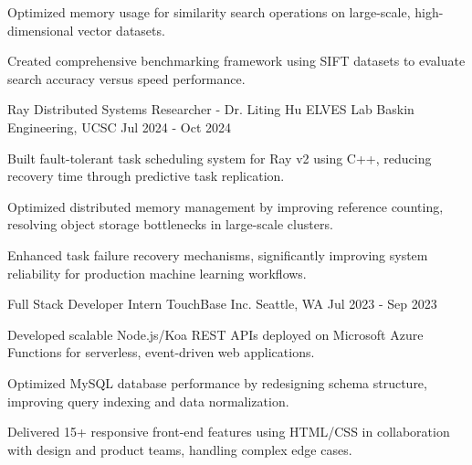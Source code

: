 \begin{cventries}
{\begin{cvitems}
        \item {Optimized memory usage for similarity search operations on large-scale, high-dimensional vector datasets.}
        \item {Created comprehensive benchmarking framework using SIFT datasets to evaluate search accuracy versus speed performance.}
        \end{cvitems}
    }
\cventry
    {Ray Distributed Systems Researcher - Dr. Liting Hu} %
    {ELVES Lab} %
    {Baskin Engineering, UCSC} %
    {Jul 2024 - Oct 2024} %
    {
      \begin{cvitems}
        \item {Built fault-tolerant task scheduling system for Ray v2 using C++, reducing recovery time through predictive task replication.}
        \item {Optimized distributed memory management by improving reference counting, resolving object storage bottlenecks in large-scale clusters.}
        \item {Enhanced task failure recovery mechanisms, significantly improving system reliability for production machine learning workflows.}
      \end{cvitems}
    }
\cventry
    {Full Stack Developer Intern} %
    {TouchBase Inc.} %
    {Seattle, WA} %
    {Jul 2023 - Sep 2023} %
    {
      \begin{cvitems} %
        \item {Developed scalable Node.js/Koa REST APIs deployed on Microsoft Azure Functions for serverless, event-driven web applications.}
        \item {Optimized MySQL database performance by redesigning schema structure, improving query indexing and data normalization.}
        \item {Delivered 15+ responsive front-end features using HTML/CSS in collaboration with design and product teams, handling complex edge cases.}
      \end{cvitems}
    }
\end{cventries}
